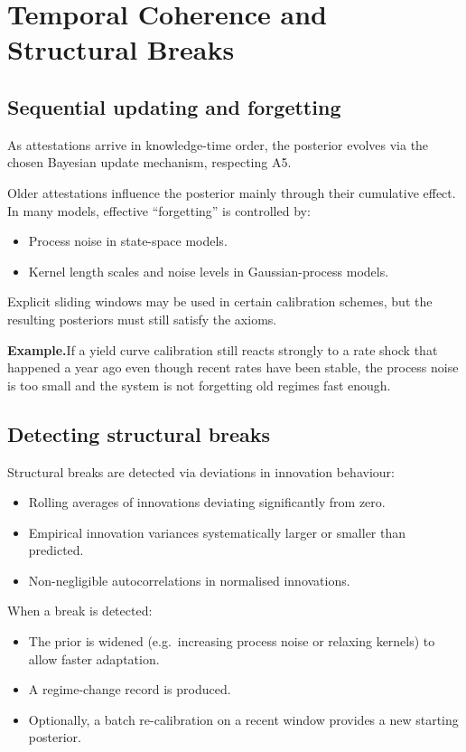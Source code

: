 \documentclass[11pt,a4paper]{article}
\begin{document}
\section{Temporal Coherence and Structural Breaks}

\subsection{Sequential updating and forgetting}

As attestations arrive in knowledge-time order, the posterior evolves via the chosen Bayesian update mechanism, respecting A5.

Older attestations influence the posterior mainly through their cumulative effect. In many models, effective ``forgetting'' is controlled by:
\begin{itemize}
    \item Process noise in state-space models.
    \item Kernel length scales and noise levels in Gaussian-process models.
\end{itemize}

Explicit sliding windows may be used in certain calibration schemes, but the resulting posteriors must still satisfy the axioms.

\textbf{Example.}\quad If a yield curve calibration still reacts strongly to a rate shock that happened a year ago even though recent rates have been stable, the process noise is too small and the system is not forgetting old regimes fast enough.

\subsection{Detecting structural breaks}

Structural breaks are detected via deviations in innovation behaviour:
\begin{itemize}
    \item Rolling averages of innovations deviating significantly from zero.
    \item Empirical innovation variances systematically larger or smaller than predicted.
    \item Non-negligible autocorrelations in normalised innovations.
\end{itemize}

When a break is detected:
\begin{itemize}
    \item The prior is widened (e.g.\ increasing process noise or relaxing kernels) to allow faster adaptation.
    \item A regime-change record is produced.
    \item Optionally, a batch re-calibration on a recent window provides a new starting posterior.
\end{itemize}
\end{document}
